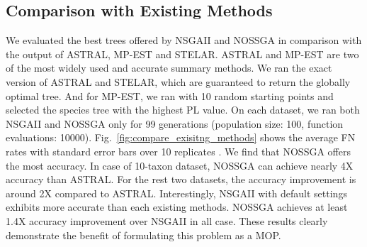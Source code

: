 \subsection{Comparison with Existing Methods}
We evaluated the best trees offered by NSGAII and NOSSGA in comparison with the output of ASTRAL, MP-EST and STELAR. ASTRAL and MP-EST are two of the most widely used and accurate
summary methods. 
We ran the exact version of ASTRAL and STELAR, which are guaranteed to return the globally optimal tree. And for MP-EST, we ran with 10 random starting points and selected the species tree with the
highest PL value. On each dataset, we ran both NSGAII and NOSSGA only for 99 generations (population size: 100, function evaluations: 10000). 
Fig.~\ref{fig:compare_exisitng_methods} shows the average FN rates with standard error bars over 10 replicates . We find that NOSSGA offers the most accuracy. In case of 10-taxon dataset, NOSSGA can achieve nearly 4X accuracy than ASTRAL. For the rest two datasets, the accuracy improvement is around 2X compared to ASTRAL. Interestingly, NSGAII with default settings exhibits more accurate than each existing methods. NOSSGA achieves at least 1.4X accuracy improvement over NSGAII in all case. These results clearly demonstrate the benefit of formulating this problem as a MOP. 



